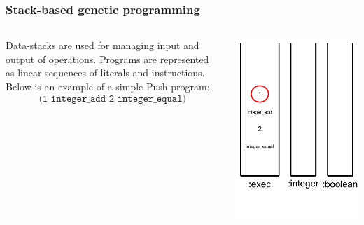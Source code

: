 \documentclass{beamer}
\newcommand{\linespace}{\vskip 0.25cm}
\begin{document}
\begin{frame}
	\frametitle{Stack-based genetic programming}
	\begin{columns}
		\begin{column}{0.65\textwidth}
			Data-stacks are used for managing input and output of operations.
			\linespace
			\linespace
			\linespace
			Programs are represented as linear sequences of literals and instructions. Below is an example of a simple Push program:
			\[\texttt{(1 integer\_add 2 integer\_equal)}\]
		\end{column}
		\begin{column}{0.35\textwidth}
			\includegraphics[height=.7\textheight]{Illustrations/stack_2.PDF}
		\end{column}
	\end{columns}
\end{frame}
\end{document}
